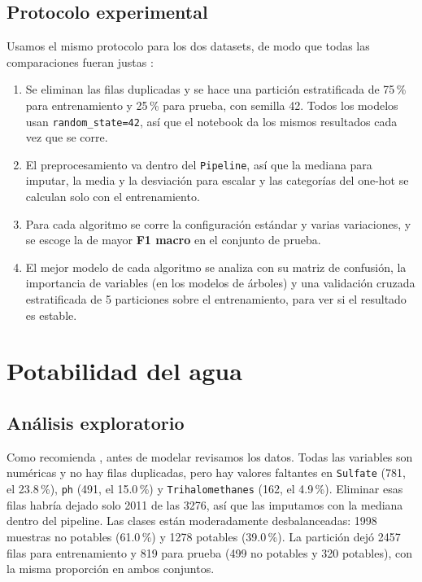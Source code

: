\documentclass[11pt,a4paper]{article}
\let\citepOriginal\citep
\renewcommand*{\citep}[1]{\textbf{\citepOriginal{#1}}}%
\let\citetOriginal\citet
\renewcommand*{\citet}[1]{\textbf{\citetOriginal{#1}}}%
\begin{document}
\subsection{Protocolo experimental}
Usamos el mismo protocolo para los dos datasets, de modo que todas las comparaciones fueran justas \citep{kohavi1995}:
\begin{enumerate}
  \item Se eliminan las filas duplicadas y se hace una partición estratificada de 75\,\% para entrenamiento y 25\,\% para prueba, con semilla 42. Todos los modelos usan \texttt{random\_state=42}, así que el notebook da los mismos resultados cada vez que se corre.
  \item El preprocesamiento va dentro del \texttt{Pipeline}, así que la mediana para imputar, la media y la desviación para escalar y las categorías del one-hot se calculan solo con el entrenamiento.
  \item Para cada algoritmo se corre la configuración estándar y varias variaciones, y se escoge la de mayor \textbf{F1 macro} en el conjunto de prueba.
  \item El mejor modelo de cada algoritmo se analiza con su matriz de confusión, la importancia de variables (en los modelos de árboles) y una validación cruzada estratificada de 5 particiones sobre el entrenamiento, para ver si el resultado es estable.
\end{enumerate}

\section{Potabilidad del agua}

\subsection{Análisis exploratorio}
Como recomienda \citet{tukey1977}, antes de modelar revisamos los datos. Todas las variables son numéricas y no hay filas duplicadas, pero hay valores faltantes en \texttt{Sulfate} (781, el 23.8\,\%), \texttt{ph} (491, el 15.0\,\%) y \texttt{Trihalomethanes} (162, el 4.9\,\%). Eliminar esas filas habría dejado solo 2011 de las 3276, así que las imputamos con la mediana dentro del pipeline. Las clases están moderadamente desbalanceadas: 1998 muestras no potables (61.0\,\%) y 1278 potables (39.0\,\%). La partición dejó 2457 filas para entrenamiento y 819 para prueba (499 no potables y 320 potables), con la misma proporción en ambos conjuntos.
\end{document}
